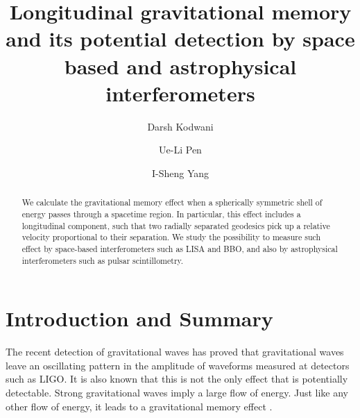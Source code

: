 \documentclass[aps,showpacs,twocolumn,floats,prd,superscriptaddress,nofootinbib]{revtex4-1}
\begin{document}
\title{Longitudinal gravitational memory and its potential detection by space based and astrophysical interferometers}

\author{Darsh Kodwani}

\author{Ue-Li Pen}

\author{I-Sheng Yang}

\begin{abstract}
We calculate the gravitational memory effect when a spherically symmetric shell of energy passes through a spacetime region. In particular, this effect includes a longitudinal component, such that two radially separated geodesics pick up a relative velocity proportional to their separation. We study the possibility to measure such effect by space-based interferometers such as LISA and BBO, and also by astrophysical interferometers such as pulsar scintillometry.
\end{abstract}

\maketitle

\section{Introduction and Summary}

The recent detection of gravitational waves \cite{GW1509} has proved that gravitational waves leave an oscillating pattern in the amplitude of waveforms measured at detectors such as LIGO. It is also known that this is not the only effect that is potentially detectable. Strong gravitational waves imply a large flow of energy. Just like any other flow of energy, it leads to a gravitational memory effect \cite{Christodoulou_effect,GW_memory}. 
\end{document}
